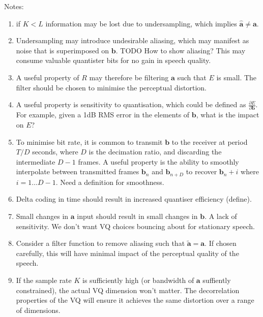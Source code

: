 \documentclass[12]{article}
\begin{document}
Notes:
\begin{enumerate}
\item if $K<L$ information may be lost due to undersampling, which implies $\hat{\mathbf{a}} \neq \mathbf{a}$.
\item Undersampling may introduce undesirable aliasing, which may manifest as noise that is superimposed on $\mathbf{b}$.  TODO How to show aliasing? This may consume valuable quantister bits for no gain in speech quality.
\item A useful property of $R$ may therefore be filtering $\mathbf{a}$ such that $E$ is small.  The filter should be chosen to minimise the perceptual distortion.
\item A useful property is sensitivity to quantisation, which could be defined as $\frac{\partial E}{\partial \mathbf{b}}$. For example, given a 1dB RMS error in the elements of $\mathbf{b}$, what is the impact on $E$?
\item To minimise bit rate, it is common to transmit $\mathbf{b}$ to the receiver at period $T/D$ seconds, where $D$ is the decimation ratio, and discarding the intermediate $D-1$ frames. A useful property is the ability to smoothly interpolate between transmitted frames $\mathbf{b}_n$ and $\mathbf{b}_{n+D}$ to recover $\mathbf{b}_n+i$ where $i=1 \ldots D-1$.  Need a definition for smoothness.
\item Delta coding in time should result in increased quantiser efficiency (define).
\item Small changes in $\mathbf{a}$ input should result in small changes in  $\mathbf{b}$.  A lack of sensitivity.  We don't want VQ choices bouncing about for stationary speech.
\item Consider a filter function to remove aliasing such that $\tilde{\mathbf{a}} = \mathbf{a}$.  If chosen carefully, this will have minimal impact of the perceptual quality of the speech. 
\item If the sample rate $K$ is sufficiently high (or bandwidth of $\mathbf{a}$ suffiently constrained), the actual VQ dimension won't matter.  The decorrelation properties of the VQ will ensure it achieves the same distortion over a range of dimensions.
\end{enumerate}
\end{document}
